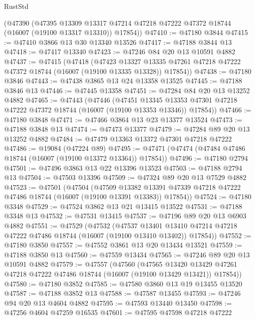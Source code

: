 \begin{lexlean}{RustStd}
\begin{coremodule}
    (@47390
      (@47395
        @13309
        @13317
        @47214
        @47218
        @47222
        @47372
        @18744
        (@16007 (@19100 @13317 @13310))
        @17854))
@47410 := @47180 @3844
@47415 := @47410 @3866 @13 @30 @13340 @13526
@47417 := @47188 @3844 @13
@47418 := @47417 @13340
@47423 := @47246 @84 @20 @13 @10591 @4882
@47437 := @47415
    (@47418
      (@47423
        @13327
        @13335
        @47261
        @47218
        @47222
        @47372
        @18744
        (@16007 (@19100 @13335 @13328))
        @17854))
@47438 := @47180 @3846
@47443 := @47438 @3865 @13 @24 @13358 @13525
@47445 := @47188 @3846 @13
@47446 := @47445 @13358
@47451 := @47284 @84 @20 @13 @13252 @4882
@47465 := @47443
    (@47446
      (@47451
        @13345
        @13353
        @47301
        @47218
        @47222
        @47372
        @18744
        (@16007 (@19100 @13353 @13346))
        @17854))
@47466 := @47180 @3848
@47471 := @47466 @3864 @13 @23 @13377 @13524
@47473 := @47188 @3848 @13
@47474 := @47473 @13377
@47479 := @47284 @89 @20 @13 @13252 @4882
@47484 := @47479 @13363 @13372 @47301 @47218 @47222
@47486 := @19084 (@47224 @89)
@47495 := @47471 (@47474 (@47484 @47486 @18744 (@16007 (@19100 @13372 @13364)) @17854))
@47496 := @47180 @2794
@47501 := @47496 @3863 @13 @22 @13396 @13523
@47503 := @47188 @2794 @13
@47504 := @47503 @13396
@47509 := @47324 @89 @20 @13 @7529 @4882
@47523 := @47501
    (@47504
      (@47509
        @13382
        @13391
        @47339
        @47218
        @47222
        @47486
        @18744
        (@16007 (@19100 @13391 @13383))
        @17854))
@47524 := @47180 @3348
@47529 := @47524 @3862 @13 @21 @13415 @13522
@47531 := @47188 @3348 @13
@47532 := @47531 @13415
@47537 := @47196 @89 @20 @13 @6903 @4882
@47551 := @47529
    (@47532
      (@47537
        @13401
        @13410
        @47214
        @47218
        @47222
        @47486
        @18744
        (@16007 (@19100 @13410 @13402))
        @17854))
@47552 := @47180 @3850
@47557 := @47552 @3861 @13 @20 @13434 @13521
@47559 := @47188 @3850 @13
@47560 := @47559 @13434
@47565 := @47246 @89 @20 @13 @10591 @4882
@47579 := @47557
    (@47560
      (@47565
        @13420
        @13429
        @47261
        @47218
        @47222
        @47486
        @18744
        (@16007 (@19100 @13429 @13421))
        @17854))
@47580 := @47180 @3852
@47585 := @47580 @3860 @13 @19 @13455 @13520
@47587 := @47188 @3852 @13
@47588 := @47587 @13455
@47593 := @47246 @94 @20 @13 @4604 @4882
@47595 := @47593 @13440 @13450
@47598 := @47256 @4604 @47259 @16535
@47601 := @47595 @47598 @47218 @47222

\end{coremodule}
\end{lexlean}
